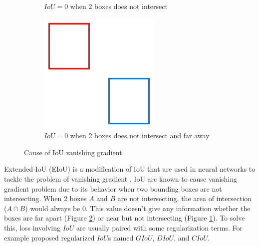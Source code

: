 \begin{figure}
\begin{subfigure}[][][t]{0.3\textwidth}
        \caption{$IoU = 0$ when 2 boxes does not intersect}
        \label{fig:iou0near}
      \end{subfigure}\hfill
      \begin{subfigure}[][][t]{0.3\textwidth}
        \includegraphics[width=1\linewidth]{figures/iou0far.png}
        \caption{$IoU = 0$ when 2 boxes does not intersect and far away}
        \label{fig:iou0far}
      \end{subfigure}
      \caption{Cause of IoU vanishing gradient}
      \label{fig:iouvanishinggrad}
  \end{figure}
  Extended-IoU (EIoU) is a modification of IoU that are used in neural networks to tackle
  the problem of vanishing gradient \parencite{eiou}. 
  IoU are known to cause vanishing gradient problem due to its behavior when two bounding boxes are not intersecting.
  When 2 boxes $A$ and $B$ are not intersecting, the area of intersection ($A\cap B$) would always be 0.
  This value doesn't give any information whether the boxes are far apart (Figure \ref{fig:iou0far}) or 
  near but not intersecting (Figure \ref{fig:iou0near}).
  To solve this, loss involving $IoU$ are usually paired with some regularization terms.
  For example \textcites{giou}{diou_ciou} proposed regularized $IoU$s named $GIoU$, $DIoU$, and $CIoU$.
  
